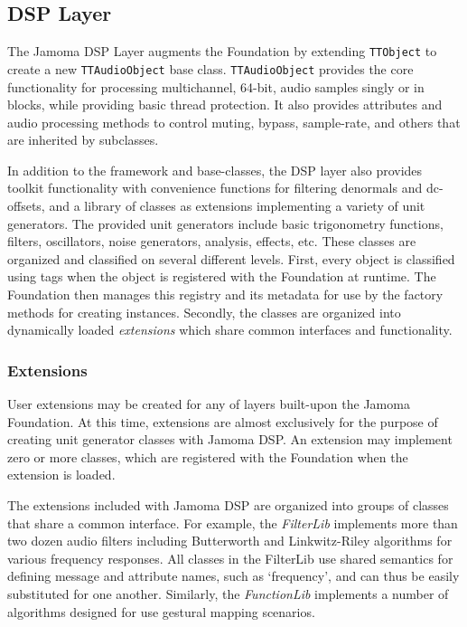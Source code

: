 \documentclass[twoside,10pt]{article}
\begin{document}


\subsection{DSP Layer} %

The Jamoma DSP Layer \cite{web9} augments the Foundation by extending \texttt{\small{TTObject}} to create a new \texttt{\small{TTAudioObject}} base class.  \texttt{\small{TTAudioObject}} provides the core functionality for processing multichannel, 64-bit, audio samples singly or in blocks, while providing basic thread protection.  It also provides attributes and audio processing methods to control muting, bypass, sample-rate, and others that are inherited by subclasses.

In addition to the framework and base-classes, the DSP layer also provides toolkit functionality with convenience functions for filtering denormals and dc-offsets, and a library of classes as extensions implementing a variety of unit generators.  The provided unit generators include basic trigonometry functions, filters, oscillators, noise generators, analysis, effects, etc.  These classes are organized and classified on several different levels.  First, every object is classified using tags when the object is registered with the Foundation at runtime.  The Foundation then manages this registry and its metadata for use by the factory methods for creating instances.  Secondly, the classes are organized into dynamically loaded \emph{extensions} which share common interfaces and functionality.

\subsubsection{Extensions}

User extensions may be created for any of layers built-upon the Jamoma Foundation.  At this time, extensions are almost exclusively for the purpose of creating unit generator classes with Jamoma DSP. An extension may implement zero or more classes, which are registered with the Foundation when the extension is loaded.

The extensions included with Jamoma DSP are organized into groups of classes that share a common interface.  For example, the \emph{FilterLib} implements more than two dozen audio filters including Butterworth and Linkwitz-Riley algorithms for various frequency responses.  All classes in the FilterLib use shared semantics for defining message and attribute names, such as `frequency', and can thus be easily substituted for one another.  Similarly, the \emph{FunctionLib} implements a number of algorithms designed for use gestural mapping scenarios.  
\end{document}
